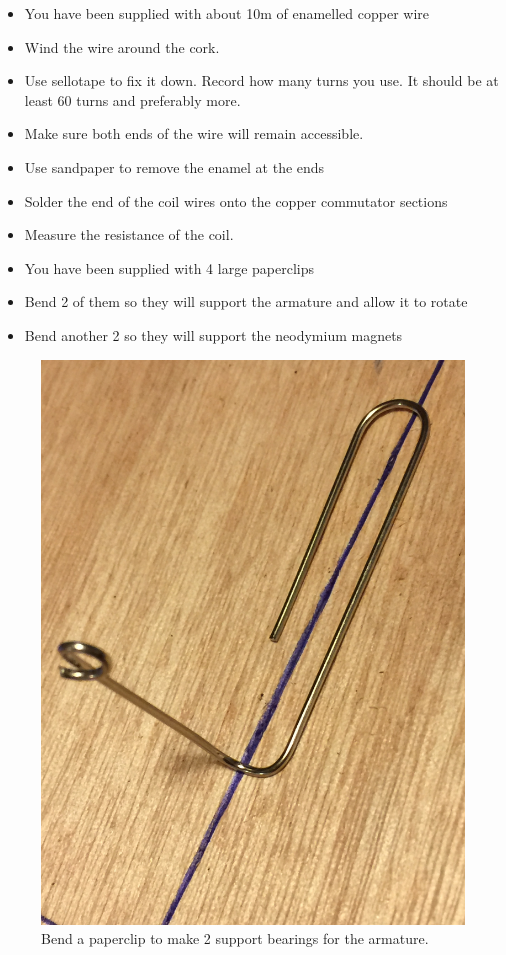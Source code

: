 \documentclass{instructions}
\begin{document}
\begin{itemize}
\item You have been supplied with about 10m of enamelled copper wire
\item Wind the wire around the cork.
\item Use sellotape to fix it down. Record how many turns you use. It should
  be at least 60 turns and preferably more.
\item Make sure both ends of the wire will remain accessible.
\item Use sandpaper to remove the enamel at the ends
\item Solder the end of the coil wires onto the copper commutator sections
\item Measure the resistance of the coil.

  \end{itemize}

\begin{itemize}
\item You have been supplied with 4 large paperclips
\item Bend 2 of them so they will support the armature and allow it to
  rotate
\item Bend another 2 so they will support the neodymium magnets
\end{itemize}


\begin{figure}[!]
    \centering
    \includegraphics[width=0.4\linewidth]{dc-motor-003}
    \caption{Bend a paperclip to make 2 support bearings for the
    armature.}

    \label{fig4}
\end{figure}



\end{document}
